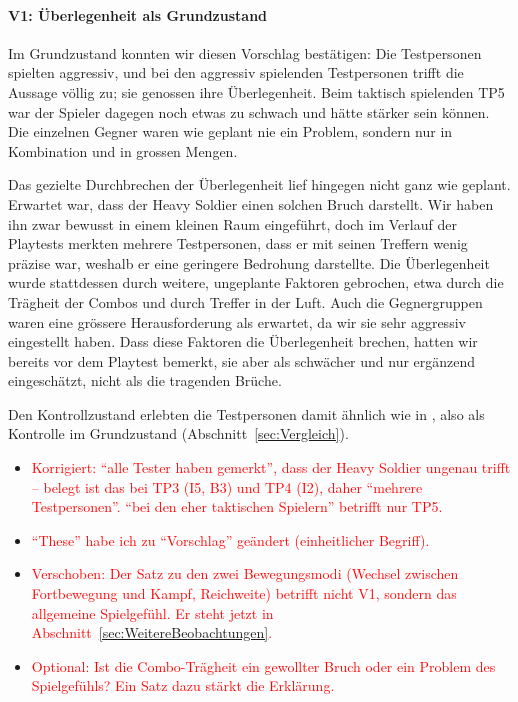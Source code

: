 \documentclass[../Main.tex]{subfiles}
\begin{document}
\paragraph{V1: Überlegenheit als Grundzustand}
Im Grundzustand konnten wir diesen Vorschlag bestätigen: Die Testpersonen spielten aggressiv, und bei den aggressiv spielenden Testpersonen trifft die Aussage völlig zu; sie genossen ihre Überlegenheit. Beim taktisch spielenden TP5 war der Spieler dagegen noch etwas zu schwach und hätte stärker sein können. Die einzelnen Gegner waren wie geplant nie ein Problem, sondern nur in Kombination und in grossen Mengen.

Das gezielte Durchbrechen der Überlegenheit lief hingegen nicht ganz wie geplant. Erwartet war, dass der Heavy Soldier einen solchen Bruch darstellt. Wir haben ihn zwar bewusst in einem kleinen Raum eingeführt, doch im Verlauf der Playtests merkten mehrere Testpersonen, dass er mit seinen Treffern wenig präzise war, weshalb er eine geringere Bedrohung darstellte. Die Überlegenheit wurde stattdessen durch weitere, ungeplante Faktoren gebrochen, etwa durch die Trägheit der Combos und durch Treffer in der Luft. Auch die Gegnergruppen waren eine grössere Herausforderung als erwartet, da wir sie sehr aggressiv eingestellt haben. Dass diese Faktoren die Überlegenheit brechen, hatten wir bereits vor dem Playtest bemerkt, sie aber als schwächer und nur ergänzend eingeschätzt, nicht als die tragenden Brüche.

Den Kontrollzustand erlebten die Testpersonen damit ähnlich wie in , also als Kontrolle im Grundzustand (Abschnitt~\ref{sec:Vergleich}).

\begin{itemize}[leftmargin=1.5cm]
    \item \textcolor{red}{Korrigiert: \enquote{alle Tester haben gemerkt}, dass der Heavy Soldier ungenau trifft -- belegt ist das bei TP3 (I5, B3) und TP4 (I2), daher \enquote{mehrere Testpersonen}. \enquote{bei den eher taktischen Spielern} betrifft nur TP5.}
    \item \textcolor{red}{\enquote{These} habe ich zu \enquote{Vorschlag} geändert (einheitlicher Begriff).}
    \item \textcolor{red}{Verschoben: Der Satz zu den zwei Bewegungsmodi (Wechsel zwischen Fortbewegung und Kampf, Reichweite) betrifft nicht V1, sondern das allgemeine Spielgefühl. Er steht jetzt in Abschnitt~\ref{sec:WeitereBeobachtungen}.}
    \item \textcolor{red}{Optional: Ist die Combo-Trägheit ein gewollter Bruch oder ein Problem des Spielgefühls? Ein Satz dazu stärkt die Erklärung.}
\end{itemize}
\end{document}
